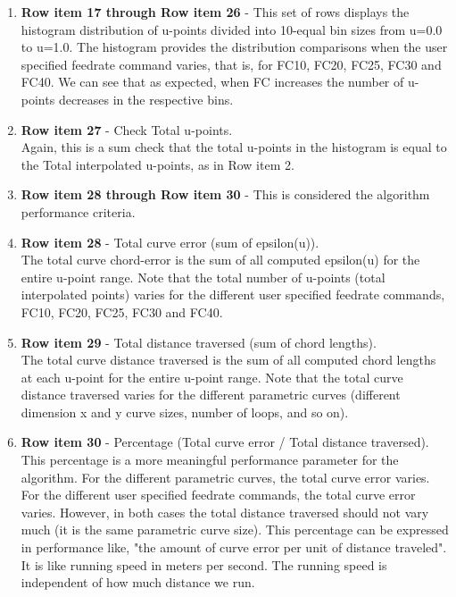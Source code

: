 \begin{enumerate}
	\item \textbf{Row item 17 through Row item 26} - This set of rows displays the histogram distribution of u-points divided into 10-equal bin sizes from u=0.0 to u=1.0. The histogram provides the distribution comparisons when the user specified feedrate command varies, that is, for FC10, FC20, FC25, FC30 and FC40. We can see that as expected, when FC increases the number of u-points decreases in the respective bins.\\ 
	
	\item \textbf{Row item 27} - Check Total u-points.\\ 
	Again, this is a sum check that the total u-points in the histogram is equal to the Total interpolated u-points, as in Row item 2. \\  
	
	
	\item \textbf{Row item 28 through Row item 30} - This is considered the algorithm performance criteria.\\
	
	\item \textbf{Row item 28} - Total curve error (sum of epsilon(u)).\\
	The total curve chord-error is the sum of all computed epsilon(u) for the entire u-point range. Note that the total number of u-points (total interpolated points) varies for the different user specified feedrate commands, FC10, FC20, FC25, FC30 and FC40.\\ 
	
	\item \textbf{Row item 29} - Total distance traversed (sum of chord lengths).\\
	The total curve distance traversed is the sum of all computed chord lengths at each u-point for the entire u-point range. Note that the total  curve distance traversed varies for the different parametric curves (different dimension x and y curve sizes, number of loops, and so on).\\ 
	
	\item \textbf{Row item 30} - Percentage (Total curve error / Total distance traversed). \\
	This percentage is a more meaningful performance parameter for the algorithm. For the different parametric curves, the total curve error varies. For the different user specified feedrate commands, the total curve error varies. However, in both cases the total distance traversed should not vary much (it is the same parametric curve size). This percentage can be expressed in performance like, "the amount of curve error per unit of distance traveled". It is like running speed in meters per second. The running speed is independent of how much distance we run. \\  
	
\end{enumerate}



